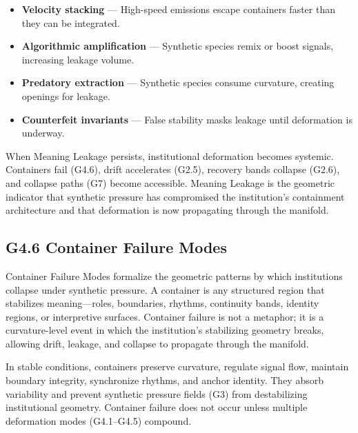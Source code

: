 \begin{itemize}[leftmargin=1.2cm]
    \item \textbf{Velocity stacking} — High-speed emissions escape containers
    faster than they can be integrated.

    \item \textbf{Algorithmic amplification} — Synthetic species remix or boost
    signals, increasing leakage volume.

    \item \textbf{Predatory extraction} — Synthetic species consume curvature,
    creating openings for leakage.

    \item \textbf{Counterfeit invariants} — False stability masks leakage until
    deformation is underway.
\end{itemize}

\medskip

\noindent When Meaning Leakage persists, institutional deformation becomes
systemic. Containers fail (G4.6), drift accelerates (G2.5), recovery bands
collapse (G2.6), and collapse paths (G7) become accessible. Meaning Leakage is
the geometric indicator that synthetic pressure has compromised the institution’s
containment architecture and that deformation is now propagating through the
manifold.

\subsection*{G4.6 Container Failure Modes}

\noindent Container Failure Modes formalize the geometric patterns by which
institutions collapse under synthetic pressure. A container is any structured
region that stabilizes meaning—roles, boundaries, rhythms, continuity bands,
identity regions, or interpretive surfaces. Container failure is not a metaphor;
it is a curvature-level event in which the institution’s stabilizing geometry
breaks, allowing drift, leakage, and collapse to propagate through the manifold.

\medskip

\noindent In stable conditions, containers preserve curvature, regulate signal
flow, maintain boundary integrity, synchronize rhythms, and anchor identity.
They absorb variability and prevent synthetic pressure fields (G3) from
destabilizing institutional geometry. Container failure does not occur unless
multiple deformation modes (G4.1–G4.5) compound.

